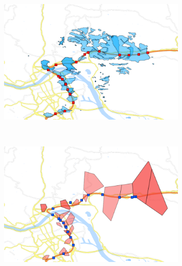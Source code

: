 \begin{figure}
	\centering
	\begin{subfigure}[b]{0.5\linewidth}
		\includegraphics[width=\textwidth]{./images/563_Coverage_Handover}
		\caption{}
		\label{fig:563coverage}
	\end{subfigure}%
	~
	\begin{subfigure}[b]{0.5\linewidth}
		\includegraphics[width=\textwidth]{./images/563_Voronoi_Handover}
		\caption{}
		\label{fig:563voronoi}
	\end{subfigure}
	

\end{figure}

